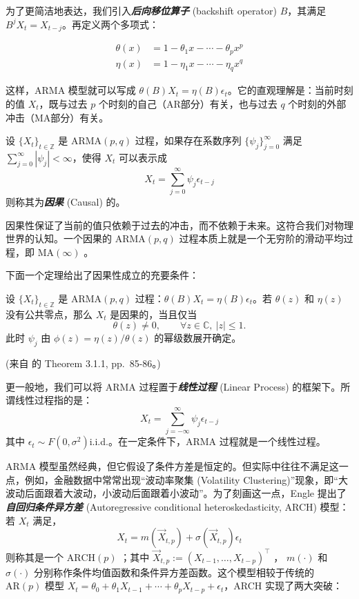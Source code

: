 为了更简洁地表达，我们引入\textbf{\emph{后向移位算子 }} (backshift operator) $B$，其满足 $B^j X_t = X_{t-j}$。再定义两个多项式：

\begin{align*}
\theta(x) &= 1 - \theta_1 x - \cdots - \theta_p x^p \\
\eta(x) &= 1 - \eta_1 x - \cdots - \eta_q x^q
\end{align*}

这样，ARMA 模型就可以写成 $\theta(B)X_t = \eta(B)\epsilon_t$。它的直观理解是：当前时刻的值 $X_t$，既与过去 $p$ 个时刻的自己（AR部分）有关，也与过去 $q$ 个时刻的外部冲击（MA部分）有关。

\begin{definition*}[因果性]
设 $\{X_t\}_{t\in\mathbb Z}$ 是 $\mathrm{ARMA}(p,q)$ 过程，如果存在系数序列 $\{\psi_j\}_{j=0}^\infty$ 满足 $\sum_{j=0}^{\infty} |\psi_j| < \infty$，使得 $X_t$ 可以表示成
\[X_t = \sum_{j=0}^{\infty} \psi_j \epsilon_{t-j}\]
则称其为\textbf{\emph{因果}} (Causal) 的。
\end{definition*}

因果性保证了当前的值只依赖于过去的冲击，而不依赖于未来。这符合我们对物理世界的认知。一个因果的 $\mathrm{ARMA}(p,q)$ 过程本质上就是一个无穷阶的滑动平均过程，即 $\mathrm{MA}(\infty)$ 。

下面一个定理给出了因果性成立的充要条件：

\begin{theorem}
\label{thm:ch4:arma-causality}

设 $\{X_t\}_{t\in\mathbb Z}$ 是 $\mathrm{ARMA}(p,q)$ 过程：$\theta(B)X_t=\eta(B)\epsilon_t$。若 $\theta(z)$ 和 $\eta(z)$ 没有公共零点，那么 $X_t$ 是因果的，当且仅当
\[
\theta(z)\ne 0,\qquad \forall z\in\mathbb{C},\ |z|\le 1.
\]
此时 $\psi_j$ 由 $\phi(z)=\eta(z)/\theta(z)$ 的幂级数展开确定。

(来自 \cite{brockwelldavis2006} 的 Theorem 3.1.1, pp.~85-86。)
\end{theorem}

更一般地，我们可以将 ARMA 过程置于\textbf{\emph{线性过程}} (Linear Process) 的框架下。所谓线性过程指的是：
\[X_{t} = \sum_{j = -\infty}^{\infty}\psi_{j}\epsilon_{t - j}\]
其中 $\epsilon_{t}\sim F(0,\sigma^{2})$i.i.d.。在一定条件下，ARMA 过程就是一个线性过程。

ARMA 模型虽然经典，但它假设了条件方差是恒定的。但实际中往往不满足这一点，例如，金融数据中常常出现``波动率聚集 (Volatility Clustering)''现象，即``大波动后面跟着大波动，小波动后面跟着小波动''。为了刻画这一点，Engle 提出了\textbf{\emph{自回归条件异方差}} (Autoregressive conditional heteroskedasticity, ARCH) 模型：若 $X_t$ 满足，
\[X_{t} = m(\vec{X}_{t,p}) + \sigma (\vec{X}_{t,p})\epsilon_{t}\]
则称其是一个 $\mathrm{ARCH}(p)$ ；其中 $\vec{X}_{t,p} := (X_{t - 1},\dots ,X_{t - p})^{\top}$ ， $m(\cdot)$ 和 $\sigma(\cdot)$ 分别称作条件均值函数和条件异方差函数。这个模型相较于传统的 $\mathrm{AR}(p)$ 模型 $X_t=\theta_0+\theta_1 X_{t-1}+\cdots+\theta_pX_{t-p}+\epsilon_t$，ARCH 实现了两大突破：

